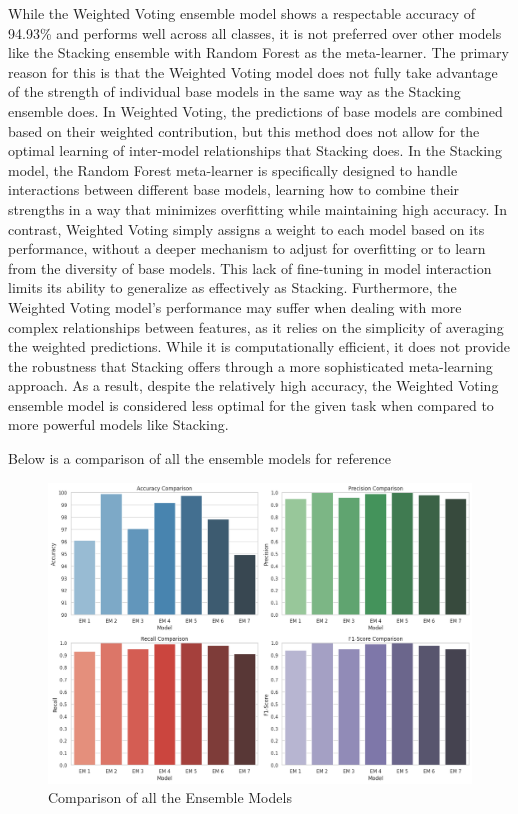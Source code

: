 \noindent
While the Weighted Voting ensemble model shows a respectable accuracy of 94.93\% and performs well across all classes, it is not preferred over other models like the Stacking ensemble with Random Forest as the meta-learner. The primary reason for this is that the Weighted Voting model does not fully take advantage of the strength of individual base models in the same way as the Stacking ensemble does. In Weighted Voting, the predictions of base models are combined based on their weighted contribution, but this method does not allow for the optimal learning of inter-model relationships that Stacking does. In the Stacking model, the Random Forest meta-learner is specifically designed to handle interactions between different base models, learning how to combine their strengths in a way that minimizes overfitting while maintaining high accuracy. In contrast, Weighted Voting simply assigns a weight to each model based on its performance, without a deeper mechanism to adjust for overfitting or to learn from the diversity of base models. This lack of fine-tuning in model interaction limits its ability to generalize as effectively as Stacking. Furthermore, the Weighted Voting model's performance may suffer when dealing with more complex relationships between features, as it relies on the simplicity of averaging the weighted predictions. While it is computationally efficient, it does not provide the robustness that Stacking offers through a more sophisticated meta-learning approach. As a result, despite the relatively high accuracy, the Weighted Voting ensemble model is considered less optimal for the given task when compared to more powerful models like Stacking.

\vspace{1em}

\noindent
Below is a comparison of all the ensemble models for reference

\begin{figure}[h!]  
    \centering
    \includegraphics[width=1.0\textwidth]{Images/EM COMPARE.png}  
    \caption{Comparison of all the Ensemble Models}
    \label{dfdl1244883}  %
\end{figure}



\pagebreak





